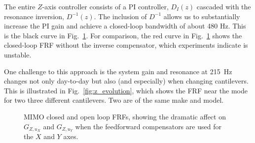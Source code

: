 \documentclass[twocolumn,twoside]{IEEEtran/IEEEtran}
\begin{document}
\begin{figure}[t!]
  \centering
  
  \caption{}
  \label{fig:z_control}
\end{figure}
The entire $Z$-axis controller consists of a PI controller, $D_I(z)$ cascaded
with the resonance inversion, $D^{-1}(z)$. The inclusion of $D^{-1}$ allows us
to substantially increase the PI gain and achieve a closed-loop bandwidth of
about 480 Hz. This is the black curve in Fig.~\ref{fig:z_control}. For
comparison, the red curve in Fig.~\ref{fig:z_control} shows the closed-loop FRF
without the inverse compensator, which experiments indicate is unstable.

One challenge to this approach is the system gain and resonance at 215~Hz
changes not only day-to-day but also (and especially) when changing cantilevers.
This is illustrated in Fig.~\ref{fig:z_evolution}, which shows the FRF near the
mode for two three different cantilevers. Two are of the same make and model.

\begin{figure}
  \centering
  
  \caption{MIMO closed and open loop FRFs, showing the dramatic affect on $G_{Z,u_X}$ and $G_{Z,u_Y}$ when the feedforward compensators are used for the $X$ and $Y$ axes.}
  \label{fig:mimo_frf_uxuy}
\end{figure}
\end{document}

